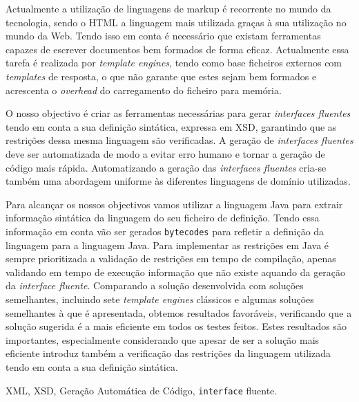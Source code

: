 \abstractPT  %

Actualmente a utilização de linguagens de markup é recorrente no mundo da tecnologia, sendo o \ac{HTML} a linguagem mais utilizada graças à sua utilização no mundo da Web. Tendo isso em conta é necessário que existam ferramentas capazes de escrever documentos bem formados de forma eficaz. Actualmente essa tarefa é realizada por \textit{template engines}, tendo como base ficheiros externos com \textit{templates} de resposta, o que não garante que estes sejam bem formados e acrescenta o \textit{overhead} do carregamento do ficheiro para memória.

\noindent
O nosso objectivo é criar as ferramentas necessárias para gerar \textit{interfaces fluentes} tendo em conta a sua definição sintática, expressa em \ac{XSD}, garantindo que as restrições dessa mesma linguagem são verificadas. A geração de \textit{interfaces fluentes} deve ser automatizada de modo a evitar erro humano e tornar a geração de código mais rápida. Automatizando a geração das \textit{interfaces fluentes} cria-se também uma abordagem uniforme às diferentes linguagens de domínio utilizadas.

\noindent
Para alcançar os nossos objectivos vamos utilizar a linguagem Java para extrair informação sintática da linguagem do seu ficheiro de definição. Tendo essa informação em conta vão ser gerados \texttt{bytecodes} para refletir a definição da linguagem para a linguagem Java. Para implementar as restrições em Java é sempre prioritizada a validação de restrições em tempo de compilação, apenas validando em tempo de execução informação que não existe aquando da geração da \textit{interface fluente}.
\noindent
Comparando a solução desenvolvida com soluções semelhantes, incluindo sete \textit{template engines} clássicos e algumas soluções semelhantes à que é apresentada, obtemos resultados favoráveis, verificando que a solução sugerida é a mais eficiente em todos os testes feitos. Estes resultados são importantes, especialmente considerando que apesar de ser a solução mais eficiente introduz também a verificação das restrições da linguagem utilizada tendo em conta a sua definição sintática.

\begin{keywords}
XML, XSD, Geração Automática de Código, \texttt{interface} fluente.
\end{keywords}
